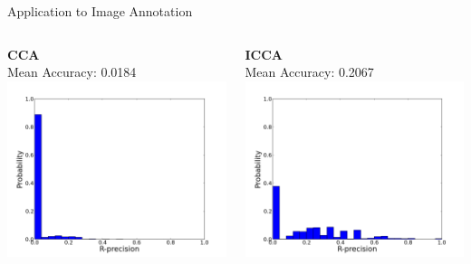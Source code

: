\documentclass[8pt]{beamer}
\begin{document}
\begin{frame}{Application to Image Annotation}

  \vspace{2ex}

  \begin{columns}[T]
   \begin{column}{0.5\textwidth}
      \centering
      \textbf{CCA}\\
      Mean Accuracy: 0.0184\\
      \includegraphics[width=1\textwidth]{figures/cca_rprec.png}
    \end{column}
    \begin{column}{0.5\textwidth}
      \centering
      \textbf{ICCA}\\
      Mean Accuracy: 0.2067\\
      \includegraphics[width=1\textwidth]{figures/icca_rprec.png}
    \end{column}
  \end{columns}

\end{frame}
\end{document}
